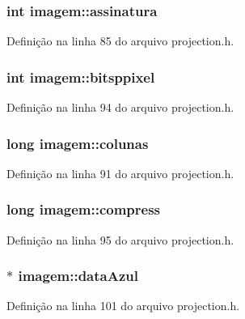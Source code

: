 \subsubsection[{assinatura}]{\setlength{\rightskip}{0pt plus 5cm}int imagem\+::assinatura}\label{structimagem_aa4e939289a9f1439947214a01e2b4ec4}


Definição na linha 85 do arquivo projection.\+h.

\subsubsection[{bitsppixel}]{\setlength{\rightskip}{0pt plus 5cm}int imagem\+::bitsppixel}\label{structimagem_a4544fafb85bb7185de0761bcd3c11a04}


Definição na linha 94 do arquivo projection.\+h.

\subsubsection[{colunas}]{\setlength{\rightskip}{0pt plus 5cm}long imagem\+::colunas}\label{structimagem_a6b38020dde09d23e790b07bc0f68d9ca}


Definição na linha 91 do arquivo projection.\+h.

\subsubsection[{compress}]{\setlength{\rightskip}{0pt plus 5cm}long imagem\+::compress}\label{structimagem_a652c7192e49fca82f5c20df50b6087ad}


Definição na linha 95 do arquivo projection.\+h.

\subsubsection[{data\+Azul}]{$\ast$ imagem\+::data\+Azul}\label{structimagem_a7a6ceb50d60fb0661682f23b7d96e33d}


Definição na linha 101 do arquivo projection.\+h.

